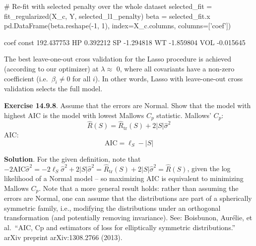 \begin{python}
# Re-fit with selected penalty over the whole dataset
selected_fit = fit_regularized(X_c, Y, selected_l1_penalty)
beta = selected_fit.x
pd.DataFrame(beta.reshape(-1, 1), index=X_c.columns, columns=['coef'])
\end{python}
\begin{console}
             coef
const  192.437753
HP       0.392212
SP      -1.294818
WT      -1.859804
VOL     -0.015645
\end{console}
The best leave-one-out cross validation for the Lasso procedure is
achieved (according to our optimizer) at \(\lambda \approx\) 0, where
all covariants have a non-zero coefficient (i.e.~\(\beta_{i} \neq 0\) for
all \(i\)).
In other words, Lasso with leave-one-out cross validation selects the
full model.

\textbf{Exercise 14.9.8}. Assume that the errors are Normal. Show that
the model with highest AIC is the model with lowest Mallows \(C_p\)
statistic.
Mallows' \(C_p\):
\[
\hat{R}(S) = \hat{R}_\text{tr}(S) + 2 |S| \hat{\sigma}^{2}
\]
AIC:
\[
 \text{AIC} = \ell_S - |S|
\]

\textbf{Solution}.
For the given definition, note that
\(-2 \text{AIC} \hat{\sigma}^{2} = -2 \ell_S \hat{\sigma}^{2} + 2|S| \hat{\sigma}^{2} = \hat{R}_\text{tr}(S) + 2 |S| \hat{\sigma}^{2} = \hat{R}(S)\),
given the log likelihood of a Normal model -- so maximizing AIC is
equivalent to minimizing Mallows \(C_p\).
Note that a more general result holds: rather than assuming the errors
are Normal, one can assume that the distributions are part of a
spherically symmetric family, i.e., modifying the distributions under an
orthogonal transformation (and potentially removing invariance). See:
Boisbunon, Aurélie, et al.~``AIC, Cp and estimators of loss for
elliptically symmetric distributions.'' arXiv preprint arXiv:1308.2766
(2013).

